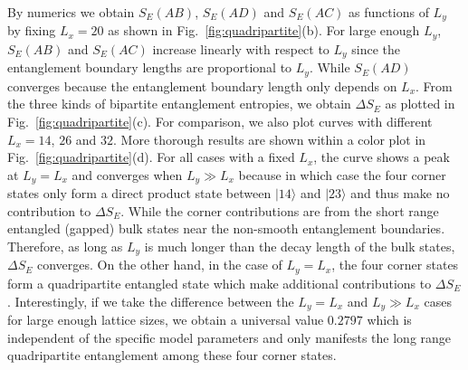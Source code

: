 \documentclass[twocolumn,superscriptaddress]{revtex4-1}
\begin{document}
By numerics we obtain $S_E(AB)$, $S_E(AD)$ and $S_E(AC)$ as functions of $L_y$ by fixing $L_x=20$ as shown in Fig.~\ref{fig:quadripartite}(b). For large enough $L_y$, $S_E(AB)$ and $S_E(AC)$ increase linearly with respect to $L_y$ since the entanglement boundary lengths are proportional to $L_y$. While $S_E(AD)$ converges because the entanglement boundary length only depends on $L_x$. From the three kinds of bipartite entanglement entropies, we obtain $\Delta S_E$ as plotted in Fig.~\ref{fig:quadripartite}(c). For comparison, we also plot curves with different $L_x=14$, $26$ and $32$. More thorough results are shown within a color plot in Fig.~\ref{fig:quadripartite}(d). For all cases with a fixed $L_x$, the curve shows a peak at $L_y=L_x$ and converges when $L_y\gg L_x$ because in which case the four corner states only form a direct product state between $|14\rangle$ and $|23\rangle$ and thus make no contribution to $\Delta S_E$. While the corner contributions are from the short range entangled (gapped) bulk states near the non-smooth entanglement boundaries. Therefore, as long as $L_y$ is much longer than the decay length of the bulk states, $\Delta S_E$ converges. On the other hand, in the case of $L_y=L_x$, the four corner states form a quadripartite entangled state which make additional contributions to $\Delta S_E$. Interestingly, if we take the difference between the $L_y=L_x$ and $L_y\gg L_x$ cases for large enough lattice sizes, we obtain a universal value $0.2797$ which is independent of the specific model parameters and only manifests the long range quadripartite entanglement among these four corner states.
\end{document}

